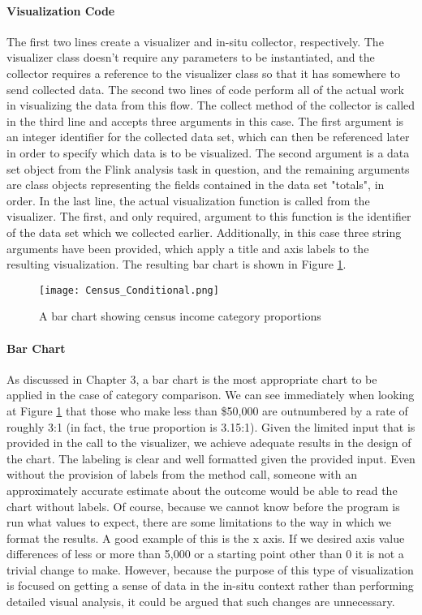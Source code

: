 \paragraph{Visualization Code}
The first two lines create a visualizer and in-situ collector, respectively. The visualizer class doesn't require any parameters to be instantiated, and the collector requires a reference to the visualizer class so that it has somewhere to send collected data. The second two lines of code perform all of the actual work in visualizing the data from this flow. The collect method of the collector is called in the third line and accepts three arguments in this case. The first argument is an integer identifier for the collected data set, which can then be referenced later in order to specify which data is to be visualized. The second argument is a data set object from the Flink analysis task in question, and the remaining arguments are class objects representing the fields contained in the data set "totals", in order. In the last line, the actual visualization function is called from the visualizer. The first, and only required, argument to this function is the identifier of the data set which we collected earlier. Additionally, in this case three string arguments have been provided, which apply a title and axis labels to the resulting visualization. The resulting bar chart is shown in Figure \ref{fig:conditional}.     

\begin{figure}
	\centering
	\texttt{[image: Census\_Conditional.png]}
	\caption{A bar chart showing census income category proportions}
	\label{fig:conditional}
\end{figure}

\paragraph{Bar Chart}
As discussed in Chapter 3, a bar chart is the most appropriate chart to be applied in the case of category comparison. We can see immediately when looking at Figure \ref{fig:conditional} that those who make less than \$50,000 are outnumbered by a rate of roughly 3:1 (in fact, the true proportion is 3.15:1). Given the limited input that is provided in the call to the visualizer, we achieve adequate results in the design of the chart. The labeling is clear and well formatted given the provided input. Even without the provision of labels from the method call, someone with an approximately accurate estimate about the outcome would be able to read the chart without labels. Of course, because we cannot know before the  program is run what values to expect, there are some limitations to the way in which we format the results. A good example of this is the x axis. If we desired axis value differences of less or more than 5,000 or a starting point other than 0 it is not a trivial change to make. However, because the purpose of this type of visualization is focused on getting a sense of data in the in-situ context rather than performing detailed visual analysis, it could be argued that such changes are unnecessary.

